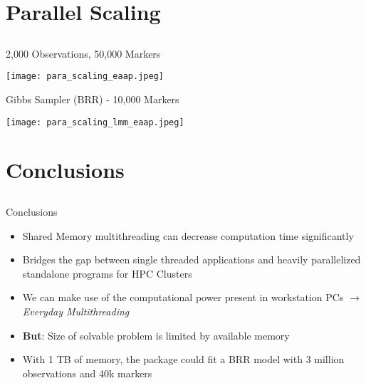 \documentclass[xcolor=dvipsnames,aspectratio=169]{beamer}
\begin{document}
\section{Parallel Scaling}
\subsection*{}
\begin{frame}{2,000 Observations, 50,000 Markers}
\pause
\begin{center}
\texttt{[image: para\_scaling\_eaap.jpeg]}
\end{center}

\end{frame}

\begin{frame}{Gibbs Sampler (BRR) - 10,000 Markers}
\pause
\begin{center}
\texttt{[image: para\_scaling\_lmm\_eaap.jpeg]}
\end{center}

\end{frame}


\section{Conclusions}
\subsection*{}
\begin{frame}{Conclusions}
\pause
\begin{itemize}
\item Shared Memory multithreading can decrease computation time significantly
\item Bridges the gap between single threaded applications and heavily parallelized standalone programs for HPC Clusters
\item We can make use of the computational power present in workstation PCs 
$\rightarrow$ \textit{Everyday Multithreading}
\pause
\item \textbf{But}: Size of solvable problem is limited by available memory
\item With 1 TB of memory, the package could fit a BRR model with
3 million observations and 40k markers
\end{itemize}
\end{frame}
\end{document}

